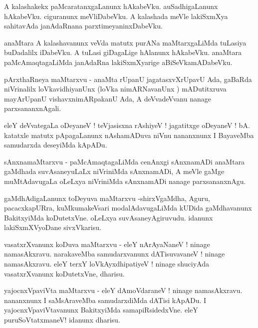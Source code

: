 \documentclass{article}
\begin{document}
\begin{mn}%
A kalashakekx paMcaratanxgaLanunx hAkabeVku. auSadhigaLanunx hAkabeVku. ciguranunx meVliDabeVku. A kalashada meVle lakiSxmXya sahitavAda janAdaRnana  parxtimeyaninxDabeVku.
\end{mn}

\begin{mn}%
anaMtara A kalashavanunx veVda matutx purANa maMtarxgaLiMda tuLasiya buDadalilx iDabeVku. A tuLasi giDagaLige 
hAlanunx hAkabeVku. anaMtara paMcAmaqtagaLiMda janAdaRna lakiSxmXyarige aBiSeVkamADabeVku.
\end{mn}

\begin{mn}%
pArxthaRneya maMtarxvu - anaMta rUpanU jagatasxvXrUpavU Ada, gaBaRda niVrinalilx loVkavidhiyanUnx  (loVka 
nimARNavanUnx ) mADutitxruva mayArUpanU vishavxnimARpakanU Ada, A deVvadeVvanu nanage parxsananxnAgali.
\end{mn}

\begin{mn}%
eleY deVvategaLa oDeyaneV ! teVjasisxna rAshiyeV ! jagatitxge oDeyaneV !  bA. katatxle matutx pApagaLanunx 
nAshamADuva niVnu nananxnunx I BayaveMba samudarxda deseyiMda kApADu.
\end{mn}

\begin{mn}%
sAnxnamaMtarxvu - paMcAmaqtagaLiMda cenAnxgi sAnxnamADi anaMtara gaMdhada suvAsaneyuLaLx niVriniMda sAnxnamADi, A meVle gaMge muMtAdavugaLa oLeLxya niVriniMda sAnxnamADi nanage parxsananxnAgu.
\end{mn}

\begin{mn}%
gaMdhAdigaLanunx toDeyuva maMtarxvu -shirxVgaMdha, Aguru, pacacxkapURra, kuMkumakeVsari modalAdavugaLiMda kUDida 
gaMdhavanunx BakitxyiMda koDutetxVne. oLeLxya suvAsaneyAgiruvudu. idanunx lakiSxmXVyoDane sivxVkarisu.
\end{mn}

\begin{mn}%
vasatxrXvanunx koDuva maMtarxvu - eleY nArAyaNaneV ! ninage namasAkxravu. narakaveMba samudarxvanunx dATisuvavaneV ! 
ninage namasAkxravu. eleY terxY loVkAyxdhipatiyeV ! ninage shuciyAda vasatxrXvanunx koDutetxVne, dharisu.
\end{mn}

\begin{mn}%
yajocnxVpaviVta maMtarxvu - eleY dAmoVdaraneV ! ninage namasAkxravu. nananxnunx I saMsAraveMba samudarxdiMda dATisi kApADu. I yajocnxVpaviVtavanunx BakitxyiMda samapiRsidedxVne. eleY puruSoVtatxmaneV! idanunx dharisu.
\end{mn}
\end{document}
